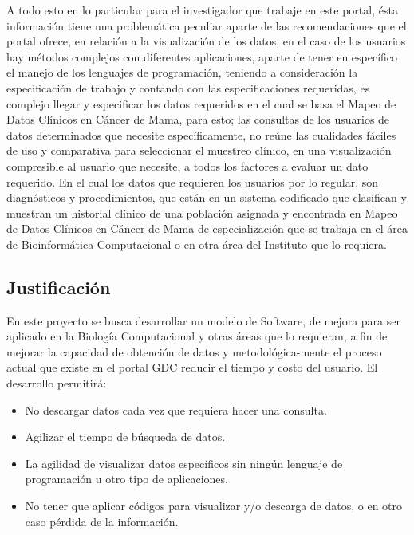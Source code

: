\documentclass[10pt,a4paper]{article}
\begin{document}
A todo esto en lo particular para el investigador que trabaje en este portal, \'esta informaci\'on tiene una problemática peculiar aparte de las recomendaciones que el portal ofrece, en relaci\'on a la visualizaci\'on de los datos, en el caso de los usuarios hay m\'etodos complejos con diferentes aplicaciones, aparte de tener en espec\'ifico el manejo de los lenguajes de programaci\'on, teniendo a consideraci\'on la especificaci\'on de trabajo y contando con las especificaciones requeridas, es complejo llegar y especificar los datos requeridos en el cual se basa el Mapeo de Datos Cl\'inicos en C\'ancer de Mama, para esto; las consultas de los usuarios de datos determinados que necesite espec\'ificamente, no re\'une las cualidades f\'aciles de uso y comparativa para seleccionar el muestreo cl\'inico, en una visualizaci\'on compresible al usuario que necesite, a todos los factores a evaluar un dato requerido. En el cual los datos que requieren los usuarios por lo regular, son diagn\'osticos y procedimientos, que est\'an en un sistema codificado que clasifican y muestran un historial cl\'inico de una poblaci\'on asignada y encontrada en Mapeo de Datos Cl\'inicos en C\'ancer de Mama de especializaci\'on que se trabaja en el \'area de Bioinform\'atica Computacional o en otra \'area del Instituto que lo requiera.

\subsection{Justificación}

En este proyecto se busca desarrollar un modelo de Software, de mejora para ser aplicado en la Biolog\'ia Computacional y otras \'areas que lo requieran, a fin de mejorar la capacidad de obtenci\'on de datos y metodol\'ogica-mente el proceso actual que existe en el portal GDC reducir el tiempo y costo del usuario.
El desarrollo permitir\'a:

\begin{itemize}

\item No descargar datos cada vez que requiera hacer una consulta. 
\item Agilizar el tiempo de b\'usqueda de datos.
\item La agilidad de visualizar datos espec\'ificos sin ning\'un lenguaje de programaci\'on u otro tipo de aplicaciones.
\item No tener que aplicar c\'odigos para visualizar y/o descarga de datos, o en otro caso p\'erdida de la informaci\'on.


\end{itemize}
\end{document}
